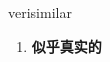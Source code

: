 
\begin{frame}
{\huge verisimilar}
\begin{center}
\begin{enumerate}\Large
  \item \textbf{似乎真实的}
\end{enumerate}
\end{center}
\end{frame}
